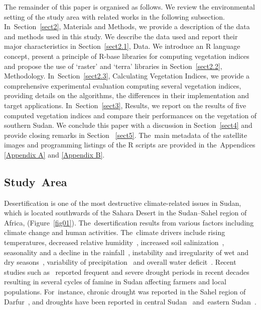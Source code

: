 \documentclass[jimaging,article,accept,pdftex,moreauthors]{Definitions/mdpi}
\begin{document}
The remainder of this paper is organised as follows. We review the environmental setting of the study area with related works in the following subsection. In~Section~\ref{sect2}, Materials and Methods, we provide a description of the data and methods used in this study. We describe the data used and report their major characteristics in Section~\ref{sect2.1}, Data. We introduce an R language concept, present a principle of R-base libraries for computing vegetation indices and propose the use of `raster' and `terra' libraries in Section~\ref{sect2.2}, Methodology. In~Section~\ref{sect2.3}, Calculating Vegetation Indices, we provide a comprehensive experimental evaluation computing several vegetation indices, providing details on the algorithms,  the differences in their implementation and target applications. In~Section~\ref{sect3}, Results, we report on the results of five computed vegetation indices and compare their performances on the vegetation of southern Sudan. We conclude this paper with a discussion in Section~\ref{sect4} and provide closing remarks in Section %
~\ref{sect5}. The~main metadata of the satellite images and programming listings of the R scripts are provided in the~Appendices \ref{Appendix A} and \ref{Appendix B}.

\subsection{Study~Area}

Desertification is one of the most destructive climate-related issues in Sudan, which is located southwards of the Sahara Desert in the Sudan--Sahel region of Africa, (Figure~\ref{fig01}). The~desertification results from various factors including climate change and human activities. The~climate drivers include rising temperatures, decreased relative humidity~\cite{Alvi}, increased soil salinization~\cite{DAWELBAIT201245}, seasonality and a decline in the rainfall~\cite{MOHAMED20223265}, instability and irregularity of wet and dry seasons~\cite{HULME198689}, variability of precipitation~\cite{Elagib,Ayoub} and overall water deficit~\cite{akhtar1994methods}. Recent studies such as~\cite{SALIH2017S31} reported frequent and severe drought periods in recent decades resulting in several cycles of famine in Sudan affecting farmers and local populations. For~instance, chronic drought was reported in the Sahel region of Darfur~\cite{FULLER198739}, and droughts have been reported in central Sudan~\cite{Salih2022} and~eastern Sudan~\cite{TARIKU2021144863,SULIEMAN2012132}. 
\end{document}
